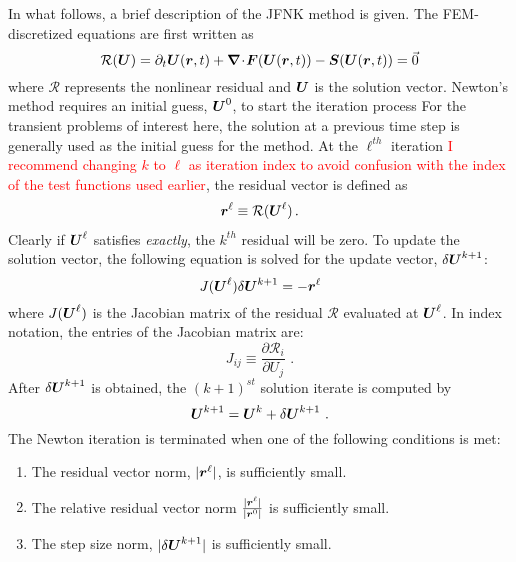 In what follows, a brief description of the JFNK method is given.  The FEM-discretized equations are first written as
\begin{equation}
  \label{eqn:F}
  \mathcal{R} (\boldsymbol U) = \partial_t \boldsymbol U(\boldsymbol r, t) + \boldsymbol{\nabla}\! \cdot \! \boldsymbol F(\boldsymbol U(\boldsymbol r, t)) - \boldsymbol S(\boldsymbol U(\boldsymbol r, t)) = \vec{0}
\end{equation}
where $\mathcal{R}$ represents the nonlinear residual and $\boldsymbol U$
is the solution vector. Newton's method requires an initial guess,
$\boldsymbol U^0$, to start the iteration process For the transient
problems of interest here, the solution at a previous time step is
generally used as the initial guess for the method. At the $\ell^{th}$
iteration \textcolor{red}{I recommend changing $k$ to $\ell$ as iteration index to avoid confusion with the index of the test functions used earlier}, the residual vector is defined as
\begin{align}
  \boldsymbol r^\ell \equiv \mathcal{R} (\boldsymbol U^\ell)\,.
\end{align}
Clearly if $\boldsymbol U^\ell$ satisfies  \emph{exactly}, the
$k^{th}$ residual will be zero.  To update the solution vector, the
following equation is solved for the update vector, $\delta
\boldsymbol U^{k+1}$:
\begin{equation}
  \label{eqn:newton_correction}
J (\boldsymbol U^\ell) \delta \boldsymbol U^{k+1} = - \boldsymbol r^\ell
\end{equation}
where $J(\boldsymbol U^\ell)$ is the Jacobian
matrix of the residual $\mathcal{R}$ evaluated at $\boldsymbol U^\ell$.  In index notation, the entries of the Jacobian matrix are:
\begin{equation}
  \label{eqn:jacobian_matrix}
  J_{ij} \equiv \frac {\partial \mathcal{R}_i} {\partial U_j} \,\,.
\end{equation}
After $\delta \boldsymbol U^{k+1}$ is obtained, the $(k+1)^{st}$ solution iterate
is computed by
\begin{equation}
  \boldsymbol U^{k+1} = \boldsymbol U^{k} + \delta \boldsymbol U^{k+1} \,\,.
\end{equation}
The Newton iteration is terminated when one of the following conditions is met:
\begin{enumerate}
\item The residual vector norm, $|\boldsymbol r^\ell|$, is sufficiently small.
\item The relative residual vector norm $\frac{|\boldsymbol r^\ell|}{|\boldsymbol r^0|}$  is sufficiently small.
\item The step size norm, $|\delta \boldsymbol U^{k+1}|$ is sufficiently small.
\end{enumerate}

